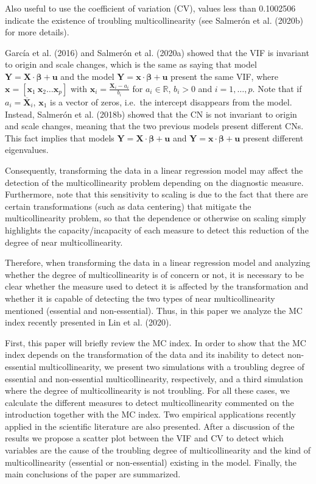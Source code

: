 Also useful to use the coefficient of variation (CV), values less than 0.1002506 indicate the existence of troubling multicollinearity (see Salmerón et al. (2020b) for more details).

García et al. (2016) and Salmerón et al. (2020a) showed that the VIF is invariant to origin and scale changes, which is the same as saying that model \(\mathbf{Y} = \mathbf{X} \cdot \boldsymbol{\beta} + \mathbf{u}\) and the model \(\mathbf{Y} = \mathbf{x} \cdot \boldsymbol{\beta} + \mathbf{u}\) present the same VIF, where \(\mathbf{x} = [\mathbf{x}_{1} \ \mathbf{x}_{2} \dots \mathbf{x}_{p}]\) with \(\mathbf{x}_{i} = \frac{\mathbf{X}_{i}-a_{i}}{b_{i}}\) for \(a_{i} \in \mathbb{R}\), \(b_{i}>0\) and \(i=1,\dots,p\). Note that if \(a_{i} = \overline{\mathbf{X}}_{i}\), \(\mathbf{x}_{1}\) is a vector of zeros, i.e.~the intercept disappears from the model. Instead, Salmerón et al. (2018b) showed that the CN is not invariant to origin and scale changes, meaning that the two previous models present different CNs. This fact implies that models \(\mathbf{Y} = \mathbf{X} \cdot \boldsymbol{\beta} + \mathbf{u}\) and \(\mathbf{Y} = \mathbf{x} \cdot \boldsymbol{\beta} + \mathbf{u}\) present different eigenvalues.

Consequently, transforming the data in a linear regression model may affect the detection of the multicollinearity problem depending on the diagnostic measure. Furthermore, note that this sensitivity to scaling is due to the fact that there are certain transformations (such as data centering) that mitigate the multicollinearity problem, so that the dependence or otherwise on scaling simply highlights the capacity/incapacity of each measure to detect this reduction of the degree of near multicollinearity.

Therefore, when transforming the data in a linear regression model and analyzing whether the degree of multicollinearity is of concern or not, it is necessary to be clear whether the measure used to detect it is affected by the transformation and whether it is capable of detecting the two types of near multicollinearity mentioned (essential and non-essential). Thus, in this paper we analyze the MC index recently presented in Lin et al. (2020).

First, this paper will briefly review the MC index. In order to show that the MC index depends on the transformation of the data and its inability to detect non-essential multicollinearity, we present two simulations with a troubling degree of essential and non-essential multicollinearity, respectively, and a third simulation where the degree of multicollinearity is not troubling. For all these cases, we calculate the different measures to detect multicollinearity commented on the introduction together with the MC index. Two empirical applications recently applied in the scientific literature are also presented. After a discussion of the results we propose a scatter plot between the VIF and CV to detect which variables are the cause of the troubling degree of multicollinearity and the kind of multicollinearity (essential or non-essential) existing in the model. Finally, the main conclusions of the paper are summarized.

